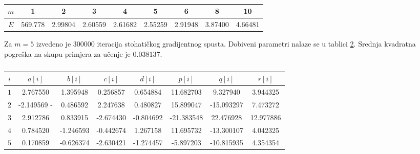 \documentclass[paper=a4, fontsize=11pt]{scrartcl} %
\numberwithin{equation}{section} %
\numberwithin{figure}{section} %
\numberwithin{table}{section} %
\begin{document}
\begin{center}
\begin{table}[h]
\label{T1}
\caption{}
\begin{tabular}{|c|c|c|c|c|c|c|c|c|}
\hline 
$m$ & 1 & 2 & 3 & 4 & 5 & 6 & 8 & 10 \\ 
\hline 
$E$ & 569.778 & 2.99804 & 2.60559 & 2.61682 & 2.55259 & 2.91948 & 3.87400 & 4.66481 \\ 
\hline 
\end{tabular} 
\end{table}
\end{center}

Za $m=5$ izvedeno je $300000$ iteracija stohatičkog gradijentnog spusta. Dobiveni parametri nalaze se u tablici \ref{T2}. Srednja kvadratna pogreška na skupu primjera za učenje je $0.038137$.

\begin{center}
\begin{table}[h]
\label{T2}
\caption{}
\begin{tabular}{|c|c|c|c|c|c|c|c|}
\hline 
$i$ & $a[i]$ & $b[i]$ & $c[i]$ & $d[i]$ & $p[i]$ & $q[i]$ & $r[i]$ \\ 
\hline 
$1$ & 2.767550 & 1.395948 & 0.256857 & 0.654884 & 11.682703 & 9.327940 & 3.944325 \\
\hline 
$2$ & -2.149569 -& 0.486592 & 2.247638 & 0.480827 & 15.899047 & -15.093297 & 7.473272 \\
\hline 
$3$ & 2.912786 & 0.833915 & -2.674430 & -0.804692 & -21.383548 & 22.476928 & 12.977886 \\
\hline 
$4$ & 0.784520 & -1.246593 & -0.442674 & 1.267158 & 11.695732 & -13.300107 & 4.042325 \\
\hline 
$5$ & 0.170859 & -0.626374 & -2.630421 & -1.274457 & -5.897203 & -10.815935 & 4.354354 \\  
\hline 
\end{tabular} 
\end{table}
\end{center}

 
\end{document}
